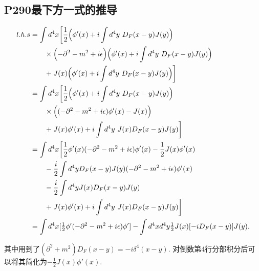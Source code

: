 \subsection{P290最下方一式的推导}\label{subsec: P290-derivation}
\begin{equation}
  \begin{aligned}
    l.h.s & = \int d^4 x \biggl[\frac{1}{2}\Bigl(\phi'(x) + i\int d^4y\ D_F(x-y)J(y)\Bigr)                                         \\
          & \qquad \times \Bigl(-\partial^2 - m^2 + i\epsilon\Bigr)\Bigl(\phi'(x) + i\int d^4y\ D_F(x-y)J(y)\Bigr)                 \\
          & \qquad + J(x)\Bigl(\phi'(x) + i\int d^4y\ D_F(x-y)J(y)\Bigr)\biggr]                                                    \\
          & = \int d^4 x \biggl[\frac{1}{2}\Bigl(\phi'(x) + i\int d^4y\ D_F(x-y)J(y)\Bigr)                                         \\
          & \qquad \times \Bigl((-\partial^2 - m^2 + i\epsilon)\phi'(x) - J(x)\Bigr)                                               \\
          & \qquad + J(x)\phi'(x) + i\int d^4y\ J(x)D_F(x-y)J(y)\biggr]                                                            \\
          & = \int d^4 x \biggl[\frac{1}{2}\phi'(x)(-\partial^2 - m^2 + i\epsilon)\phi'(x) - \frac{1}{2}J(x)\phi'(x)               \\
          & \qquad - \frac{i}{2}\int d^4y D_F(x-y)J(y)(-\partial^2 - m^2 + i\epsilon)\phi'(x)                                      \\
          & \qquad - \frac{i}{2}\int d^4y J(x)D_F(x-y)J(y)                                                                         \\
          & \qquad + J(x)\phi'(x) + i\int d^4y\ J(x)D_F(x-y)J(y)\biggr]                                                            \\
          & = \int d^4x [\tfrac{1}{2}\phi'(-\partial^2 - m^2 + i\epsilon)\phi'] - \int d^4x d^4y \tfrac{1}{2}J(x)[-iD_F(x-y)]J(y).
  \end{aligned}
\end{equation}

其中用到了$(\partial^2 + m^2)D_F(x-y) = -i\delta^4(x-y)$.
对倒数第4行分部积分后可以将其简化为$-\frac{1}{2}J(x)\phi'(x)$.


